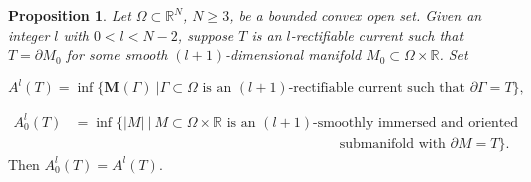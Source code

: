 \documentclass{amsart}
\numberwithin{equation}{section}
\theoremstyle{definition}
\newtheorem{proposition}[theorem]{Proposition}
\theoremstyle{remark}
\newcommand{\R}{\mathbb{R}}
\begin{document}
\begin{proposition} {\it Let $\Omega \subset \mathbb{R}^N$, $N\geq 3$, be a bounded convex open set. Given an integer $l$ with $0 < l < N-2$, suppose $T$ is an $l$-rectifiable current such that $T = \partial M_0$ for some smooth $(l+1)$-dimensional manifold $M_0 \subset \Omega\times\R$. Set 

\[ A^l(T) = \inf \Big\{ \mathbf{M}(\Gamma)\ | \Gamma \subset \Omega \text{ is an } (l+1)\text{-rectifiable current such that } \partial \Gamma = T \Big\},\]

\begin{align*} A_0^l(T) &= \inf \Big\{ |M|\ |\ M\subset\Omega\times\R \text{ is an } (l+1)\text{-smoothly immersed and oriented}\\
&\qquad\qquad\qquad\qquad\qquad\qquad\qquad\qquad\qquad\quad \text{submanifold with } \partial M = T \Big\}.
\end{align*}
Then $A_0^l(T) = A^l(T).$}
\end{proposition}
\end{document}
